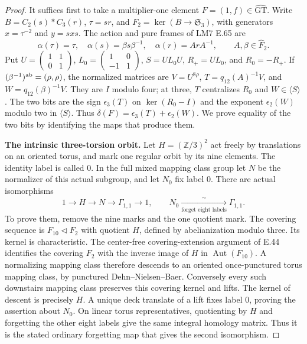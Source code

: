 \begin{proof}
It suffices first to take a multiplier-one element
$F=(1,f)\in\widehat{\mathrm{GT}}$.  Write
$B=C_2(s)*C_3(r)$, $\tau=sr$, and
$F_2=\ker(B\to\mathfrak S_3)$, with generators
$x=\tau^{-2}$ and $y=sxs$.  The action and pure frames of
LM7 E.65 are
\[
 \alpha(\tau)=\tau,\quad
 \alpha(s)=\beta s\beta^{-1},\quad
 \alpha(r)=A r A^{-1},\qquad A,\beta\in\widehat F_2.
\]
Put $U=\left(\begin{smallmatrix}1&1\\0&1\end{smallmatrix}\right)$,
$L_0=\left(\begin{smallmatrix}1&0\\-1&1\end{smallmatrix}\right)$,
$S=UL_0U$, $R_+=UL_0$, and $R_0=-R_+$.
If $(\beta^{-1})^{\rm ab}=(\rho,\rho)$, the normalized matrices
are $V=U^{8\rho}$, $T=q_{12}(A)^{-1}V$, and
$W=q_{12}(\beta)^{-1}V$.  They are $I$ modulo four;
at three, $T$ centralizes $R_0$ and $W\in\langle S\rangle$.
The two bits are the sign $\epsilon_3(T)$ on
$\ker(R_0-I)$ and the exponent $\epsilon_2(W)$ modulo two
in $\langle S\rangle$.  Thus
$\delta(F)=\epsilon_3(T)+\epsilon_2(W)$.
We prove equality of the two bits by identifying the maps that
produce them.

\par\medskip\noindent\textbf{The intrinsic three-torsion orbit.}\quad
Let $H=(\mathbb Z/3)^2$ act freely by translations on an
oriented torus, and mark one regular orbit by its nine elements.
The identity label is called $0$.  In the full mixed mapping
class group let $N$ be the normalizer of this actual subgroup,
and let $N_0$ fix label $0$.  There are actual isomorphisms
\[
 1\longrightarrow H\longrightarrow N\longrightarrow
 \Gamma_{1,1}\longrightarrow1,
 \qquad
 N_0\xrightarrow[\text{forget eight labels}]{\ \sim\ }
 \Gamma_{1,1}.
                                                               \tag{E.255}
\]
To prove them, remove the nine marks and the one quotient mark.
The covering sequence is $F_{10}\triangleleft F_2$ with quotient
$H$, defined by abelianization modulo three.  Its kernel is
characteristic.  The center-free covering-extension argument of
E.44 identifies the covering $F_2$ with the inverse image of
$H$ in $\operatorname{Aut}(F_{10})$.
A normalizing mapping class therefore descends to an oriented
once-punctured torus mapping class, by punctured
Dehn--Nielsen--Baer.  Conversely every such downstairs mapping
class preserves this covering kernel and lifts.  The kernel of
descent is precisely $H$.  A unique deck translate of a lift
fixes label $0$, proving the assertion about $N_0$.
On linear torus representatives, quotienting by $H$ and
forgetting the other eight labels give the same integral
homology matrix.  Thus it is the stated ordinary forgetting
map that gives the second isomorphism.


\end{proof}

